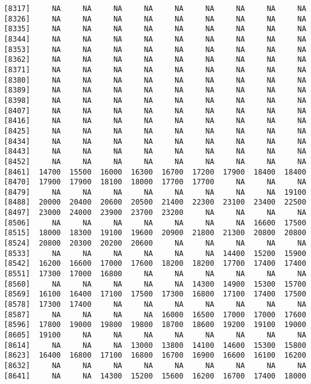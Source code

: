 \documentclass[]{article}
\begin{document}
\begin{verbatim}
 [8317]     NA     NA     NA     NA     NA     NA     NA     NA     NA
 [8326]     NA     NA     NA     NA     NA     NA     NA     NA     NA
 [8335]     NA     NA     NA     NA     NA     NA     NA     NA     NA
 [8344]     NA     NA     NA     NA     NA     NA     NA     NA     NA
 [8353]     NA     NA     NA     NA     NA     NA     NA     NA     NA
 [8362]     NA     NA     NA     NA     NA     NA     NA     NA     NA
 [8371]     NA     NA     NA     NA     NA     NA     NA     NA     NA
 [8380]     NA     NA     NA     NA     NA     NA     NA     NA     NA
 [8389]     NA     NA     NA     NA     NA     NA     NA     NA     NA
 [8398]     NA     NA     NA     NA     NA     NA     NA     NA     NA
 [8407]     NA     NA     NA     NA     NA     NA     NA     NA     NA
 [8416]     NA     NA     NA     NA     NA     NA     NA     NA     NA
 [8425]     NA     NA     NA     NA     NA     NA     NA     NA     NA
 [8434]     NA     NA     NA     NA     NA     NA     NA     NA     NA
 [8443]     NA     NA     NA     NA     NA     NA     NA     NA     NA
 [8452]     NA     NA     NA     NA     NA     NA     NA     NA     NA
 [8461]  14700  15500  16000  16300  16700  17200  17900  18400  18400
 [8470]  17900  17900  18100  18000  17700  17700     NA     NA     NA
 [8479]     NA     NA     NA     NA     NA     NA     NA     NA  19100
 [8488]  20000  20400  20600  20500  21400  22300  23100  23400  22500
 [8497]  23000  24000  23900  23700  23200     NA     NA     NA     NA
 [8506]     NA     NA     NA     NA     NA     NA     NA  16600  17500
 [8515]  18000  18300  19100  19600  20900  21800  21300  20800  20800
 [8524]  20800  20300  20200  20600     NA     NA     NA     NA     NA
 [8533]     NA     NA     NA     NA     NA     NA  14400  15200  15900
 [8542]  16200  16600  17000  17600  18200  18200  17700  17400  17400
 [8551]  17300  17000  16800     NA     NA     NA     NA     NA     NA
 [8560]     NA     NA     NA     NA     NA  14300  14900  15300  15700
 [8569]  16100  16400  17100  17500  17300  16800  17100  17400  17500
 [8578]  17300  17400     NA     NA     NA     NA     NA     NA     NA
 [8587]     NA     NA     NA     NA  16000  16500  17000  17000  17600
 [8596]  17800  19000  19800  19800  18700  18600  19200  19100  19000
 [8605]  19100     NA     NA     NA     NA     NA     NA     NA     NA
 [8614]     NA     NA     NA  13000  13800  14100  14600  15300  15800
 [8623]  16400  16800  17100  16800  16700  16900  16600  16100  16200
 [8632]     NA     NA     NA     NA     NA     NA     NA     NA     NA
 [8641]     NA     NA  14300  15200  15600  16200  16700  17400  18000

\end{verbatim}
\end{document}
